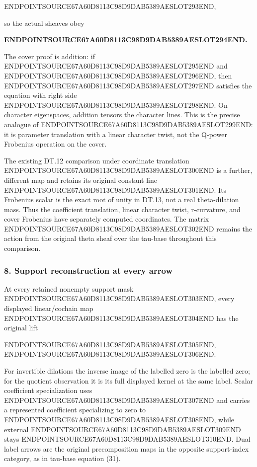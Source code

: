 ENDPOINTSOURCE67A60D8113C98D9DAB5389AESLOT293END,

so the actual sheaves obey

\textbf{ENDPOINTSOURCE67A60D8113C98D9DAB5389AESLOT294END.}

The cover proof is addition: if ENDPOINTSOURCE67A60D8113C98D9DAB5389AESLOT295END and ENDPOINTSOURCE67A60D8113C98D9DAB5389AESLOT296END, then ENDPOINTSOURCE67A60D8113C98D9DAB5389AESLOT297END satisfies the equation with right side ENDPOINTSOURCE67A60D8113C98D9DAB5389AESLOT298END. On character eigenspaces, addition tensors the character lines. This is the precise analogue of ENDPOINTSOURCE67A60D8113C98D9DAB5389AESLOT299END: it is parameter translation with a linear character twist, not the Q-power Frobenius operation on the cover.

The existing DT.12 comparison under coordinate translation ENDPOINTSOURCE67A60D8113C98D9DAB5389AESLOT300END is a further, different map and retains its original constant line ENDPOINTSOURCE67A60D8113C98D9DAB5389AESLOT301END. Its Frobenius scalar is the exact root of unity in DT.13, not a real theta-dilation mass. Thus the coefficient translation, linear character twist, r-curvature, and cover Frobenius have separately computed coordinates. The matrix ENDPOINTSOURCE67A60D8113C98D9DAB5389AESLOT302END remains the action from the original theta sheaf over the tau-base throughout this comparison.

\subsubsection{8. Support reconstruction at every arrow}\label{endpoint-f1_scaling--support-reconstruction-at-every-arrow}

At every retained nonempty support mask ENDPOINTSOURCE67A60D8113C98D9DAB5389AESLOT303END, every displayed linear/cochain map ENDPOINTSOURCE67A60D8113C98D9DAB5389AESLOT304END has the original lift

ENDPOINTSOURCE67A60D8113C98D9DAB5389AESLOT305END, ENDPOINTSOURCE67A60D8113C98D9DAB5389AESLOT306END.

For invertible dilations the inverse image of the labelled zero is the labelled zero; for the quotient observation it is its full displayed kernel at the same label. Scalar coefficient specialization uses ENDPOINTSOURCE67A60D8113C98D9DAB5389AESLOT307END and carries a represented coefficient specializing to zero to ENDPOINTSOURCE67A60D8113C98D9DAB5389AESLOT308END, while external ENDPOINTSOURCE67A60D8113C98D9DAB5389AESLOT309END stays ENDPOINTSOURCE67A60D8113C98D9DAB5389AESLOT310END. Dual label arrows are the original precomposition maps in the opposite support-index category, as in tau-base equation (31).

